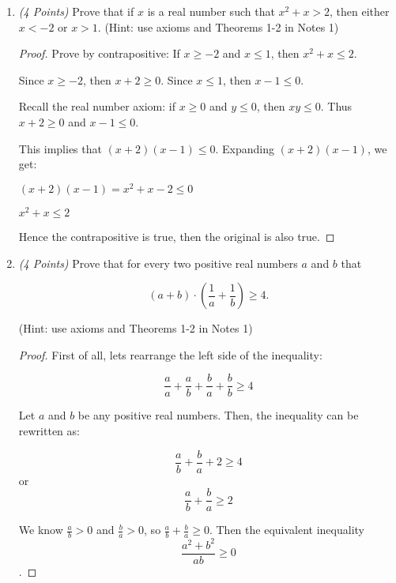 \documentclass[10pt]{article} %
\newcommand{\points}[1]{{\it (#1 Points)}}
\begin{document}
\begin{enumerate}
\item \points{4} Prove that if $x$ is a real number such that $x^2+x>2$, then either $x<-2$ or $x>1$. (Hint:  use axioms and Theorems 1-2 in Notes 1)

\bigskip


\begin{proof} Prove by contrapositive: If $x \geq -2$ and $x \leq 1$, then $x^2 + x \leq 2$.  

Since $x \geq -2$, then $x + 2 \geq 0$.  
Since $x \leq 1$, then $x - 1 \leq 0$. 

Recall the real number axiom: if $x \geq 0$ and $y \leq 0$, then $xy \leq 0$.  Thus $x + 2 \geq 0$ and $x - 1 \leq 0$.  

This implies that $(x + 2)(x - 1) \leq 0$.  Expanding $(x + 2)(x - 1)$, we get:
\begin{center} $(x + 2)(x - 1) = x^2 + x - 2 \leq 0$ \end{center}
\begin{center} $x^2 + x \leq 2$ \end{center}

Hence the contrapositive is true, then the original is also true.  

\end{proof}

\bigskip

\item \points{4} Prove that for every two positive real numbers $a$ and $b$ that

$$\left(a+b\right)\cdot \left(\frac{1}{a}+\frac{1}{b}\right)\ge 4.$$

(Hint:  use axioms and Theorems 1-2 in Notes 1)

\bigskip


\begin{proof} First of all, lets rearrange the left side of the inequality:

$$\frac{a}{a} + \frac{a}{b} + \frac{b}{a} + \frac{b}{b} \geq 4$$

Let $a$ and $b$ be any positive real numbers.  Then, the inequality can be rewritten as:

$$\frac{a}{b} + \frac{b}{a} + 2 \geq 4$$ or $$\frac{a}{b} + \frac{b}{a} \geq 2$$

We know $\frac{a}{b} > 0$ and $\frac{b}{a} > 0$, so $\frac{a}{b} + \frac{b}{a} \geq 0$.  Then the equivalent inequality $$\frac{a^2 + b^2}{ab} \geq 0$$.  


\end{proof}
\end{enumerate}
\end{document}
